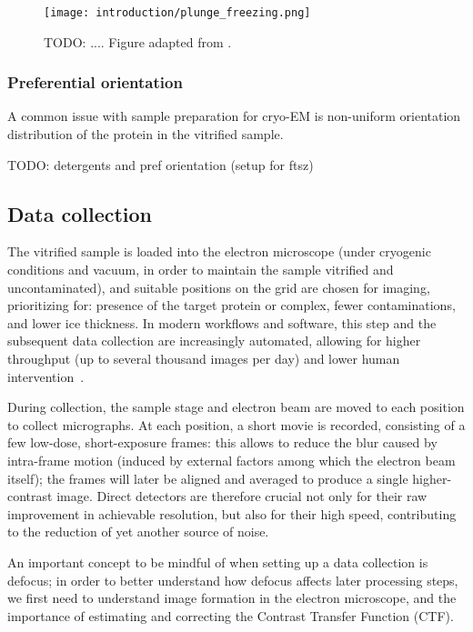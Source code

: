 \begin{figure}[ht]
    \centering
    \texttt{[image: introduction/plunge\_freezing.png]}
    \caption[Vitrification via plunge freezing]{TODO: .... Figure adapted from \citet{chungNobelPrizeChemistry2017}.}
    \label{fig:em_plunge_freezing}
\end{figure}

\subsubsection{Preferential orientation}
A common issue with sample preparation for cryo-EM is non-uniform orientation distribution of the protein in the vitrified sample. 

TODO: detergents and pref orientation (setup for ftsz)

\subsection{Data collection}
The vitrified sample is loaded into the electron microscope (under cryogenic conditions and vacuum, in order to maintain the sample vitrified and uncontaminated), and suitable positions on the grid are chosen for imaging, prioritizing for: presence of the target protein or complex, fewer contaminations, and lower ice thickness.
In modern workflows and software, this step and the subsequent data collection are increasingly automated, allowing for higher throughput (up to several thousand images per day) and lower human intervention~\cite{schorbSoftwareToolsAutomated2019}.

During collection, the sample stage and electron beam are moved to each position to collect micrographs.
At each position, a short movie is recorded, consisting of a few low-dose, short-exposure frames: this allows to reduce the blur caused by intra-frame motion (induced by external factors among which the electron beam itself); the frames will later be aligned and averaged to produce a single higher-contrast image.
Direct detectors are therefore crucial not only for their raw improvement in achievable resolution, but also for their high speed, contributing to the reduction of yet another source of noise.

An important concept to be mindful of when setting up a data collection is defocus; in order to better understand how defocus affects later processing steps, we first need to understand image formation in the electron microscope, and the importance of estimating and correcting the Contrast Transfer Function (CTF).

